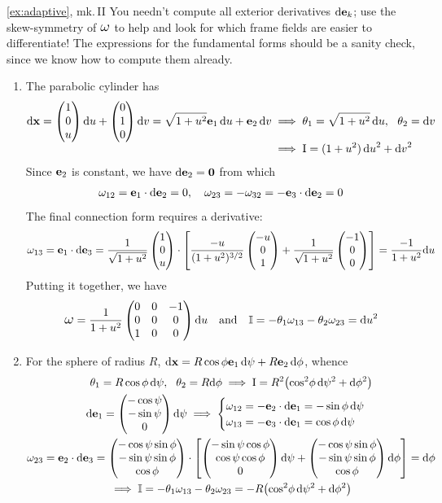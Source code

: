 \begin{examples*}{\ref{ex:adaptive}, mk.\,II}{}
You needn't compute all exterior derivatives $\mathrm{d}{\mathbf{e}}_k$; use the skew-symmetry of $\lomega$ to help and look for which frame fields are easier to differentiate! The expressions for the fundamental forms should be a sanity check, since we know how to compute them already.
	\begin{enumerate}
	  \item The parabolic cylinder has
  	\begin{align*}
  	\mathrm{d}{\mathbf{x}}=\begin{pmatrix}1\\0\\u\end{pmatrix}{\mathrm{d}u}+\begin{pmatrix}0\\1\\0\end{pmatrix}{\mathrm{d}v}=\sqrt{1+u^2}{\mathbf{e}}_1\,{\mathrm{d} u}+{\mathbf{e}}_2\,{\mathrm{d} v}
  	&\implies \theta_1=\sqrt{1+u^2}\,{\mathrm{d} u},\ \ \theta_2={\mathrm{d} v}\\[-4pt]
  	&\implies \mathrm{I}=(1+u^2)\,{\mathrm{d} u}^2+{\mathrm{d} v}^2
  	\end{align*}
  	Since ${\mathbf{e}}_2$ is constant, we have $\mathrm{d}{\mathbf{e}}_2=\mathbf{0}$ from which
  	\[\omega_{12}={\mathbf{e}}_1\cdot\mathrm{d}{\mathbf{e}}_2=0,\quad \omega_{23}=-\omega_{32}=-{\mathbf{e}}_3\cdot\mathrm{d}{\mathbf{e}}_2=0\]
  	The final connection form requires a derivative:
  	\[\omega_{13}={\mathbf{e}}_1\cdot\mathrm{d}{\mathbf{e}}_3=\frac 1{\sqrt{1+u^2}}\begin{pmatrix}1\\0\\u\end{pmatrix}\cdot\left[\frac{-u}{(1+u^2)^{3/2}}\begin{pmatrix}-u\\0\\1\end{pmatrix}+\frac 1{\sqrt{1+u^2}}\begin{pmatrix}-1\\0\\0\end{pmatrix}\right] =\frac{-1}{1+u^2}{\mathrm{d} u}\]
  	Putting it together, we have
  	\[\lomega=
	\frac{1}{1+u^2}
	\begin{pmatrix}
		0&0&-1\\
		0&0&0\\
		1&0&0
	\end{pmatrix}\du
	\quad\text{and}\quad \II=-\theta_1\omega_{13}-\theta_2\omega_{23}=\du^2\]

	  \item For the sphere of radius $R$, $\mathrm{d}{\mathbf{x}}=R\cos\phi{\mathbf{e}}_1\,\mathrm{d}\psi +R{\mathbf{e}}_2\,\mathrm{d}\phi$, whence
	  \begin{gather*}
	  \theta_1=R\cos\phi\,\mathrm{d}\psi,\ \ \theta_2=R\mathrm{d}\phi \implies \mathrm{I}=R^2\bigl(\cos^2\!\phi\,\mathrm{d}\psi^2+\mathrm{d}\phi^2\bigr)\\
		\mathrm{d}{\mathbf{e}}_1=\begin{pmatrix}-\cos\psi\\-\sin\psi\\0\end{pmatrix}\mathrm{d}\psi\implies \begin{cases}
		\omega_{12}=-{\mathbf{e}}_2\cdot\mathrm{d}{\mathbf{e}}_1=-\sin\phi\,\mathrm{d}\psi\\
		\omega_{13}=-{\mathbf{e}}_3\cdot\mathrm{d}{\mathbf{e}}_1=\cos\phi\,\mathrm{d}\psi
		\end{cases}\\
		\omega_{23}={\mathbf{e}}_2\cdot\mathrm{d}{\mathbf{e}}_3=\begin{pmatrix}-\cos\psi\sin\phi\\-\sin\psi\sin\phi\\\cos\phi\end{pmatrix}\cdot\left[\begin{pmatrix}-\sin\psi\cos\phi\\\cos\psi\cos\phi\\0\end{pmatrix}\mathrm{d}\psi+\begin{pmatrix}-\cos\psi\sin\phi\\-\sin\psi\sin\phi\\\cos\phi\end{pmatrix}\mathrm{d}\phi\right] =\mathrm{d}\phi\\
		\implies \mathbb{I}=-\theta_1\omega_{13}-\theta_2\omega_{23}=-R\bigl(\cos^2\!\phi\,\mathrm{d}\psi^2+\mathrm{d}\phi^2\bigr)
	  \end{gather*}
	  

\end{enumerate}
\end{examples*}
